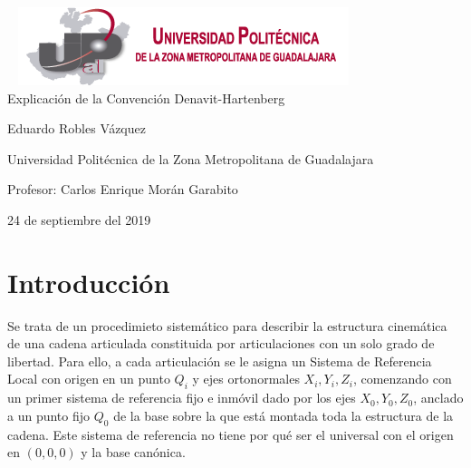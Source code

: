 \documentclass[11pt,a4paper,oldfontcommands,oneside]{memoir}
\begin{document}
%
%
\thispagestyle{empty}

{%
\sffamily
\centering
\Large

~\vspace{\fill}
\includegraphics[scale=1]{logo.png} \\
{\huge 
\vspace{4cm}
Explicación de la Convención Denavit-Hartenberg
}
\vspace{2.5cm}

{\LARGE
Eduardo Robles Vázquez
}

\vspace{2.5cm}

Universidad Politécnica de la Zona Metropolitana de Guadalajara

\vspace{3.5cm}

Profesor: Carlos Enrique Morán Garabito

\vspace{\fill}

24 de septiembre del 2019

}%

\vspace{.5cm}
\hfill\break




\tableofcontents*

\clearpage


\chapter{Introducción}
Se trata de un procedimieto sistemático para describir la estructura cinemática de una cadena articulada constituida por articulaciones con un solo grado de libertad.
Para ello, a cada articulación se le asigna un Sistema de Referencia Local con origen en un punto $Q_i$ y ejes ortonormales ${X_i,Y_i,Z_i}$, comenzando con un primer sistema de referencia fijo e inmóvil dado por los ejes ${X_0,Y_0,Z_0}$, anclado a un punto fijo $Q_0$ de la base sobre la que está montada toda la estructura de la cadena.
Este sistema de referencia no tiene por qué ser el universal con el origen en $(0,0,0)$ y la base canónica.
\vspace{2cm}
\hfill
\end{document}
